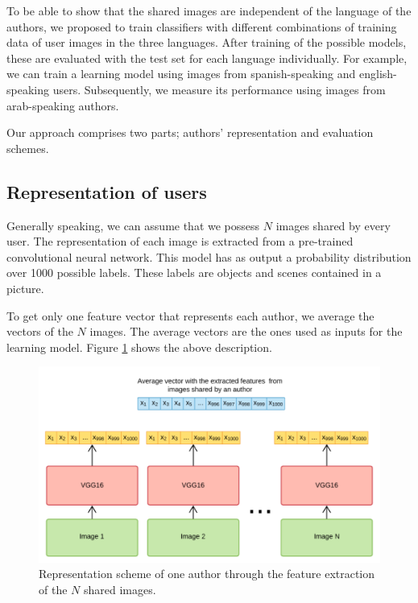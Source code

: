 \documentclass[runningheads]{llncs}
\begin{document}
To be able to show that the shared images are independent of the language
of the authors, we proposed to train classifiers
with different combinations of training data of user images 
in the three languages. After training of the possible models, these
are evaluated with the test set for each language individually.
For example, we can train a learning model using images from spanish-speaking
and english-speaking users. Subsequently, we measure its performance
using images from arab-speaking authors.

Our approach comprises two parts; authors' representation and 
evaluation schemes.

\subsection{Representation of users}

Generally speaking, we can assume that we possess $N$ images shared
by every user. The representation of each image is extracted from 
a pre-trained convolutional neural network. This model has as output a probability distribution
over 1000 possible labels. These labels are objects and scenes contained
in a picture. 

To get only one feature vector that represents each author, 
we average the vectors of the $N$ images. The average vectors 
are the ones used as inputs for the learning model. Figure \ref{fig:img_representation} shows the above description.

\begin{figure}[h]
    \centering
    \includegraphics[scale=0.25]{img/features_extraction.png}
    \caption{Representation scheme of one author through the 
    feature extraction of the $N$ shared images.}
    \label{fig:img_representation}
\end{figure}
\end{document}
